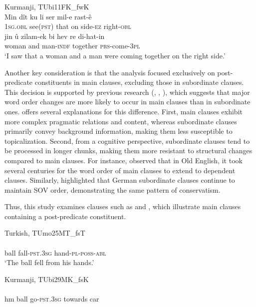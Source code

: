 \newpage
\ea%
  \label{ex:key:30} Kurmanji, TUbi11FK\_fwK \\
\gll Min    dît    ku  li ser  mil-e    rast-ê  \\
\textsc{1sg.obl}  see\textsc{(pst)}  that on {} side-\textsc{ez}    right-\textsc{obl}\\
\gll jin    û  zilam-ek  {bi hev re}  di-hat-in\\
woman    and  man-\textsc{indf} together \textsc{prs}-come-\textsc{3pl}\\
\glt ‘I saw that a woman and a man were coming together on the right side.’ 
  \z

Another key consideration is that the analysis focused exclusively on post-predicate constituents in main clauses, excluding those in subordinate clauses. This decision is supported by previous research (\citealt{Vennemann1975}, \citealt{Givon2018}, \citealt{Bybee2001}), which suggests that major word order changes are more likely to occur in main clauses than in subordinate ones. \citet{Bybee2001} offers several explanations for this difference. First, main clauses exhibit more complex pragmatic relations and content, whereas subordinate clauses primarily convey background information, making them less susceptible to topicalization. Second, from a cognitive perspective, subordinate clauses tend to be processed in longer chunks, making them more resistant to structural changes compared to main clauses. For instance, \citet{Hock1986} observed that in Old English, it took several centuries for the word order of main clauses to extend to dependent clauses. Similarly, \citet{Schmid1998} highlighted that German subordinate clauses continue to maintain SOV order, demonstrating the same pattern of conservatism.

Thus, this study examines clauses such as  and , which illustrate main clauses containing a post-predicate constituent.

\ea%
  \label{ex:key:31} Turkish, TUmo25MT\_fsT \\

        \\
ball  fall-\textsc{pst}.3\textsc{sg}  hand-\textsc{pl-poss-abl}\\
\glt ‘The ball fell from his hands.’ 
  \z

\ea%
  \label{ex:key:32} Kurmanji, TUbi29MK\_fsK \\

        \\
hm  ball  go-\textsc{pst}.3\textsc{sg}  towards  car\\

